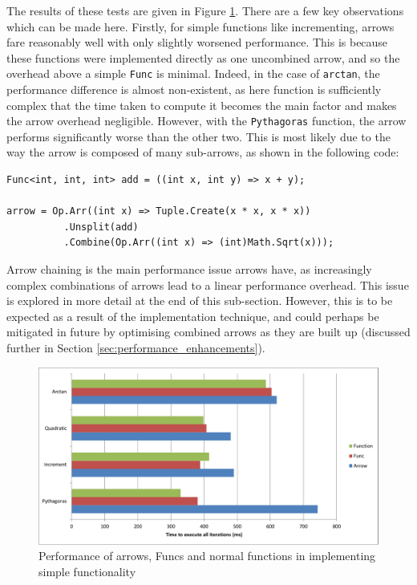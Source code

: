 \documentclass[12pt,twoside,notitlepage]{report}
\begin{document}
The results of these tests are given in Figure \ref{fig:simple_function_performance}. There are a few key observations which can be made here. Firstly, for simple functions like incrementing, arrows fare reasonably well with only slightly worsened performance. This is because these functions were implemented directly as one uncombined arrow, and so the overhead above a simple \texttt{Func} is minimal. Indeed, in the case of \texttt{arctan}, the performance difference is almost non-existent, as here function is sufficiently complex that the time taken to compute it becomes the main factor and makes the arrow overhead negligible. However, with the \texttt{Pythagoras} function, the arrow performs significantly worse than the other two. This is most likely due to the way the arrow is composed of many sub-arrows, as shown in the following code:

\begin{lstlisting}[language={[sharp]C}]
Func<int, int, int> add = ((int x, int y) => x + y);

arrow = Op.Arr((int x) => Tuple.Create(x * x, x * x))
          .Unsplit(add)
          .Combine(Op.Arr((int x) => (int)Math.Sqrt(x)));
\end{lstlisting}

Arrow chaining is the main performance issue arrows have, as increasingly complex combinations of arrows lead to a linear performance overhead. This issue is explored in more detail at the end of this sub-section. However, this is to be expected as a result of the implementation technique, and could perhaps be mitigated in future by optimising combined arrows as they are built up (discussed further in Section \ref{sec:performance_enhancements}).

\begin{figure}[!ht]
  \centering
  \includegraphics[width=\textwidth]{fig/SimpleFunctionPerformanceChart.pdf}
  \caption{Performance of arrows, Funcs and normal functions in implementing simple functionality}
  \label{fig:simple_function_performance}
\end{figure}
\end{document}
